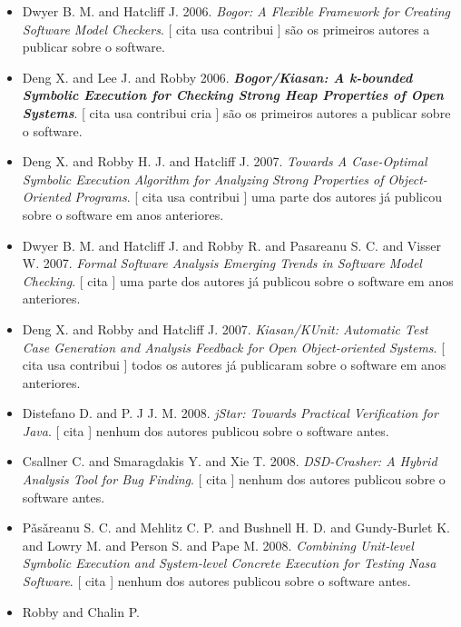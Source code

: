 \begin{itemize}
\item Dwyer B. M. and Hatcliff J.
      2006.
        \textit{ Bogor: A Flexible Framework for Creating Software Model Checkers}.
      [
          cita
          usa
          contribui
      ]
são os primeiros autores a publicar sobre o software.
\item Deng X. and Lee J. and Robby
      2006.
        \textbf{\textit{ Bogor/Kiasan: A k-bounded Symbolic Execution for Checking Strong Heap Properties of Open Systems}}.
      [
          cita
          usa
          contribui
          cria
      ]
são os primeiros autores a publicar sobre o software.
\item Deng X. and Robby H. J. and Hatcliff J.
      2007.
        \textit{ Towards A Case-Optimal Symbolic Execution Algorithm for Analyzing Strong Properties of Object-Oriented Programs}.
      [
          cita
          usa
          contribui
      ]
uma parte dos autores já publicou sobre o software em anos anteriores.
\item Dwyer B. M. and Hatcliff J. and Robby R. and Pasareanu S. C. and Visser W.
      2007.
        \textit{ Formal Software Analysis Emerging Trends in Software Model Checking}.
      [
          cita
      ]
uma parte dos autores já publicou sobre o software em anos anteriores.
\item Deng X. and Robby and Hatcliff J.
      2007.
        \textit{ Kiasan/KUnit: Automatic Test Case Generation and Analysis Feedback for Open Object-oriented Systems}.
      [
          cita
          usa
          contribui
      ]
todos os autores já publicaram sobre o software em anos anteriores.
\item Distefano D. and P. J J. M.
      2008.
        \textit{ jStar: Towards Practical Verification for Java}.
      [
          cita
      ]
nenhum dos autores publicou sobre o software antes.
\item Csallner C. and Smaragdakis Y. and Xie T.
      2008.
        \textit{ DSD-Crasher: A Hybrid Analysis Tool for Bug Finding}.
      [
          cita
      ]
nenhum dos autores publicou sobre o software antes.
\item P\v{a}s\v{a}reanu S. C. and Mehlitz C. P. and Bushnell H. D. and Gundy-Burlet K. and Lowry M. and Person S. and Pape M.
      2008.
        \textit{ Combining Unit-level Symbolic Execution and System-level Concrete Execution for Testing Nasa Software}.
      [
          cita
      ]
nenhum dos autores publicou sobre o software antes.
\item Robby and Chalin P.

\end{itemize}
